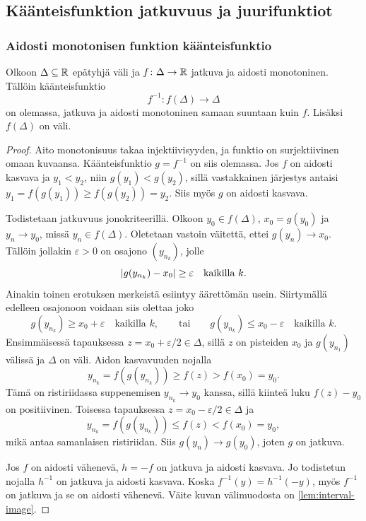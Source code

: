\documentclass[11pt,a4paper]{amsart}
\begin{document}
\newpage
\subsection{Käänteisfunktion jatkuvuus ja juurifunktiot}

\subsubsection*{Aidosti monotonisen funktion käänteisfunktio}

\begin{theorem}
  \label{thm:inverse-continuity}
  Olkoon $\Delta\subseteq\mathbb{R}$ epätyhjä väli ja
  $f\colon\Delta\to\mathbb{R}$ jatkuva ja aidosti monotoninen.
  Tällöin käänteisfunktio
  \[
    f^{-1}\colon f(\Delta)\to\Delta
  \]
  on olemassa, jatkuva ja aidosti monotoninen samaan suuntaan
  kuin $f$. Lisäksi $f(\Delta)$ on väli.
\end{theorem}
\begin{proof}
  Aito monotonisuus takaa injektiivisyyden, ja funktio on
  surjektiivinen omaan kuvaansa. Käänteisfunktio $g=f^{-1}$
  on siis olemassa. Jos $f$ on aidosti kasvava ja $y_1<y_2$,
  niin $g(y_1)<g(y_2)$, sillä vastakkainen järjestys antaisi
  $y_1=f(g(y_1))\ge f(g(y_2))=y_2$.
  Siis myös $g$ on aidosti kasvava.

  Todistetaan jatkuvuus jonokriteerillä. Olkoon
  $y_0\in f(\Delta)$, $x_0=g(y_0)$ ja $y_n\to y_0$, missä
  $y_n\in f(\Delta)$. Oletetaan vastoin väitettä, ettei
  $g(y_n)\to x_0$. Tällöin jollakin $\varepsilon>0$ on
  osajono $(y_{n_k})$, jolle
  \[
    \lvert g(y_{n_k})-x_0\rvert\ge\varepsilon
    \quad\text{kaikilla }k.
  \]
  Ainakin toinen erotuksen merkeistä esiintyy äärettömän usein.
  Siirtymällä edelleen osajonoon voidaan siis olettaa joko
  \[
    g(y_{n_k})\ge x_0+\varepsilon\quad\text{kaikilla }k,
    \qquad\text{tai}\qquad
    g(y_{n_k})\le x_0-\varepsilon\quad\text{kaikilla }k.
  \]
  Ensimmäisessä tapauksessa $z=x_0+\varepsilon/2\in\Delta$,
  sillä $z$ on pisteiden $x_0$ ja $g(y_{n_1})$ välissä ja
  $\Delta$ on väli. Aidon kasvavuuden nojalla
  \[
    y_{n_k}=f(g(y_{n_k}))\ge f(z)>f(x_0)=y_0.
  \]
  Tämä on ristiriidassa suppenemisen $y_{n_k}\to y_0$ kanssa,
  sillä kiinteä luku $f(z)-y_0$ on positiivinen.
  Toisessa tapauksessa $z=x_0-\varepsilon/2\in\Delta$ ja
  \[
    y_{n_k}=f(g(y_{n_k}))\le f(z)<f(x_0)=y_0,
  \]
  mikä antaa samanlaisen ristiriidan.
  Siis $g(y_n)\to g(y_0)$, joten $g$ on jatkuva.

  Jos $f$ on aidosti vähenevä, $h=-f$ on jatkuva ja aidosti
  kasvava. Jo todistetun nojalla $h^{-1}$ on jatkuva ja aidosti
  kasvava. Koska $f^{-1}(y)=h^{-1}(-y)$, myös $f^{-1}$ on
  jatkuva ja se on aidosti vähenevä.
  Väite kuvan välimuodosta on \cref{lem:interval-image}.
\end{proof}
\end{document}
